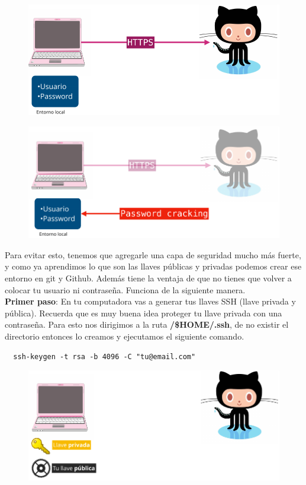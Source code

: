 \documentclass{article}
\begin{document}
\begin{figure}[h!]
  \centering
  \includegraphics[scale=0.5]{./Pictures/211_https.png}
\end{figure}

\begin{figure}[h!]
  \centering
  \includegraphics[scale=0.5]{./Pictures/212_pwd_cracking.png}
\end{figure}

Para evitar esto, tenemos que agregarle una capa de seguridad mucho más fuerte,
y como ya aprendimos lo que son las llaves públicas y privadas podemos crear
ese entorno en git y Github. Además tiene la ventaja de que no tienes que
volver a colocar tu usuario ni contraseña. Funciona de la siguiente manera.\\

\textbf{Primer paso}: En tu computadora vas a generar tus llaves SSH (llave
privada y pública). Recuerda que es muy buena idea proteger tu llave privada
con una contraseña. Para esto nos dirigimos a la ruta \textbf{/\$HOME/.ssh}, de
no existir el directorio entonces lo creamos y ejecutamos el siguiente comando.

\begin{verbatim}
  ssh-keygen -t rsa -b 4096 -C "tu@email.com"
\end{verbatim}

\begin{figure}[h!]
  \centering
  \includegraphics[scale=0.5]{./Pictures/213_public_private_keys.png}
\end{figure}
\end{document}
